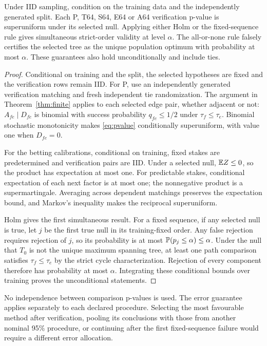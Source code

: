 \begin{proposition}\label{prop:selected}
Under IID sampling, condition on the training data and the independently generated split. Each P, T64, S64, E64 or A64 verification p-value is superuniform under its selected null. Applying either Holm or the fixed-sequence rule gives simultaneous strict-order validity at level $\alpha$. The all-or-none rule falsely certifies the selected tree as the unique population optimum with probability at most $\alpha$. These guarantees also hold unconditionally and include ties.
\end{proposition}
\begin{proof}
Conditional on training and the split, the selected hypotheses are fixed and the verification rows remain IID. For P, use an independently generated verification matching and fresh independent tie randomization. The argument in Theorem~\ref{thm:finite} applies to each selected edge pair, whether adjacent or not: $A_{fe}\mid D_{fe}$ is binomial with success probability $q_{fe}\le1/2$ under $\tau_f\le\tau_e$. Binomial stochastic monotonicity makes \eqref{eq:pvalue} conditionally superuniform, with value one when $D_{fe}=0$.

For the betting calibrations, conditional on training, fixed stakes are predetermined and verification pairs are IID. Under a selected null, $\mathbb E Z\le0$, so the product has expectation at most one. For predictable stakes, conditional expectation of each next factor is at most one; the nonnegative product is a supermartingale. Averaging across dependent matchings preserves the expectation bound, and Markov's inequality makes the reciprocal superuniform.

Holm gives the first simultaneous result. For a fixed sequence, if any selected null is true, let $j$ be the first true null in its training-fixed order. Any false rejection requires rejection of $j$, so its probability is at most $\mathbb P(p_j\le\alpha)\le\alpha$. Under the null that $T_0$ is not the unique maximum spanning tree, at least one path comparison satisfies $\tau_f\le\tau_e$ by the strict cycle characterization. Rejection of every component therefore has probability at most $\alpha$. Integrating these conditional bounds over training proves the unconditional statements.
\end{proof}

No independence between comparison p-values is used. The error guarantee applies separately to each declared procedure. Selecting the most favourable method after verification, pooling its conclusions with those from another nominal 95\% procedure, or continuing after the first fixed-sequence failure would require a different error allocation.

